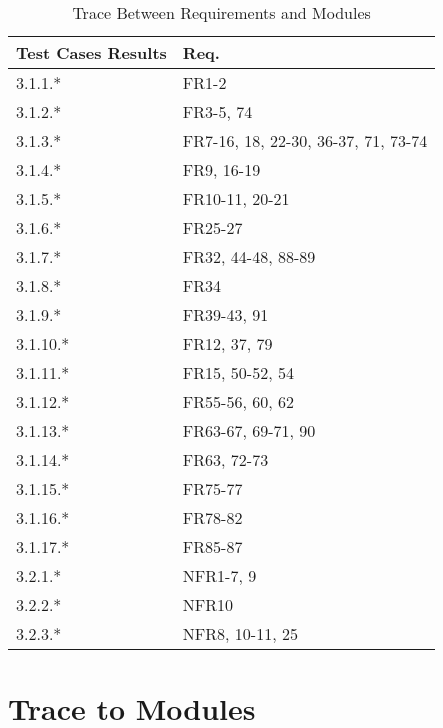 \documentclass[12pt, titlepage]{article}
\begin{document}
\begin{table}[H]
\centering
\begin{tabular}{p{}| p{}}
\toprule
\textbf{Test Cases Results} & \textbf{Req.}\\
\midrule
3.1.1.* & FR1-2\\
3.1.2.* & FR3-5, 74\\
3.1.3.* & FR7-16, 18, 22-30, 36-37, 71, 73-74\\
3.1.4.* & FR9, 16-19\\
3.1.5.* & FR10-11, 20-21\\
3.1.6.* & FR25-27\\
3.1.7.* & FR32, 44-48, 88-89\\
3.1.8.* & FR34\\
3.1.9.* & FR39-43, 91\\
3.1.10.* & FR12, 37, 79\\
3.1.11.* & FR15, 50-52, 54\\
3.1.12.* & FR55-56, 60, 62\\
3.1.13.* & FR63-67, 69-71, 90\\
3.1.14.* & FR63, 72-73\\
3.1.15.* & FR75-77\\
3.1.16.* & FR78-82\\
3.1.17.* & FR85-87\\
3.2.1.* & NFR1-7, 9\\
3.2.2.* & NFR10\\
3.2.3.* & NFR8, 10-11, 25\\
\bottomrule
\end{tabular}
\caption{Trace Between Requirements and Modules}
\end{table}
		
\section{Trace to Modules}	
\end{document}
